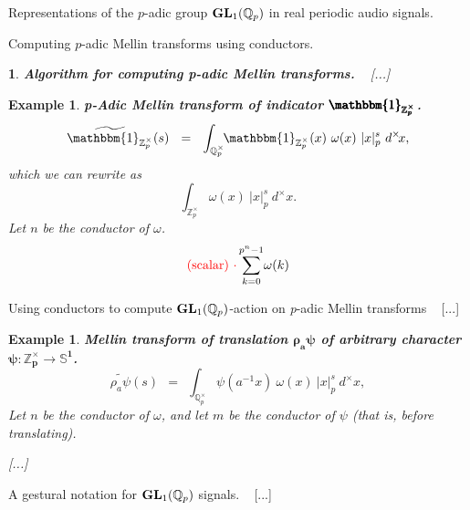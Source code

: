 \documentclass[letterpaper,11pt, reqno]{amsart}
\newtheorem{monodromy theorem}{Monodromy Theorem}[subsection]
\newtheorem{wild conjecture}[theorem]{Wild Conjecture}
\newtheorem{research objectives}{Research objectives}[subsection]
\newtheorem{research question}[theorem]{Research questions}
\newtheorem{aside question}[theorem]{Aside question}
\newtheorem{example}[theorem]{Example}
\newtheorem{audio example}[theorem]{\loudspeaker[3] Example}
\newtheorem{blank remark}[theorem]{}
\newtheorem{ssubsection}[theorem]{}
\newtheorem{terminology and comment}[theorem]{Terminology and comment}
\newtheorem{purity hypothesis}[theorem]{Purity hypothesis}
\newtheorem{corollary of the purity hypothesis}[theorem]{Corollary of the purity hypothesis}
\newcommand{\QQ} {{\mathbb Q}}
\newcommand{\ZZ} {{\mathbb Z}}
\newcommand{\lra}{{\longrightarrow}}
\numberwithin{equation}{theorem}
\begin{document}
\begin{section}{Representations of the $p$-adic group $\bold{GL}_{1}(\mathbb{Q}_{p})$
in real periodic audio signals.}
\begin{subsection}{Computing $p$-adic Mellin transforms using conductors.}
\begin{ssubsection}{{\bf Algorithm for computing {\em p}-adic Mellin transforms.}}
\ 
{\color{red} [...]}

\end{ssubsection}

\begin{example}
{\bf {\em p}-Adic Mellin transform of indicator $\pmb{\mathbbm{1}_{\ZZ^\times_p}}$.}
\normalfont
	$$
	\widetilde{{\mathbbm{1}_{\ZZ^\times_p}}}(s)
	\ \ =\ \ 
	\int_{\QQ^\times_{p}}
	\!\!\mathbbm{1}_{\ZZ^\times_p}(x)\ \omega(x)\ |x|^{s}_{p}\ d^\times\!x,
	$$
which we can rewrite as
	$$
	\int_{\ZZ^\times_p}\!\!\omega(x)\ |x|^{s}_{p}\ d^\times\!x.
	$$
Let $n$ be the conductor of $\omega$.
	$$
	{\color{red} (\text{scalar})\ \cdot}
	\sum_{k=0}^{p^{n}-1}\!\omega(k)
	$$
\end{example}

\end{subsection}

\begin{subsection}{Using conductors to compute $\bold{GL}_1(\QQ_p)$-action on {\em p}-adic Mellin transforms}
\ {\color{red} [...]}

\begin{example}
{\bf Mellin transform of translation $\pmb{\rho_{a}\psi}$ of arbitrary character $\pmb{\psi:\ZZ^\times_p\lra\mathbb{S}^1}$.}
\normalfont
	$$
	\widetilde{{\rho_{a}\psi}}(s)
	\ \ =\ \ 
	\int_{\QQ^\times_{p}}
	\psi(a^{-1}x)\ \omega(x)\ |x|^{s}_{p}\ d^\times\!x,
	$$
Let $n$ be the conductor of $\omega$, and let $m$ be the conductor of $\psi$ (that is, before translating).

{\color{red} [...]}
\end{example}

\end{subsection}

\begin{subsection}{A gestural notation for $\bold{GL}_{1}(\QQ_p)$ signals.}
\ 
{\color{red} [...]}

\end{subsection}


\end{section}

\vskip 1cm
\end{document}

